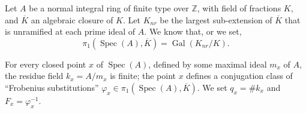 \documentclass{article}
\theoremstyle{plain}
\theoremstyle{definition}
\newcommand{\ZZ}{\mathbb{Z}}
\DeclareMathOperator{\Gal}{Gal}
\DeclareMathOperator{\Spec}{Spec}
\newcommand{\oldpage}[1]{\marginpar{\footnotesize$\Big\vert$ \textit{p.~#1}}}
\begin{document}
Let $A$ be a normal integral ring of finite type over $\ZZ$, with field of fractions $K$,
\oldpage{426}
and $\overline{K}$ an algebraic closure of $K$.
Let $K_{nr}$ be the largest sub-extension of $\overline{K}$ that is unramified at each prime ideal of $A$.
We know that, or we set,
\[
  \pi_1(\Spec(A),\overline{K}) = \Gal(K_{nr}/K).
\]

For every closed point $x$ of $\Spec(A)$, defined by some maximal ideal $m_x$ of $A$, the residue field $k_x=A/m_x$ is finite;
the point $x$ defines a conjugation class of ``Frobenius substitutions'' $\varphi_x\in\pi_1(\Spec(A),\overline{K})$.
We set $q_x=\#k_x$ and $F_x=\varphi_x^{-1}$.




\nocite{*}
\end{document}
